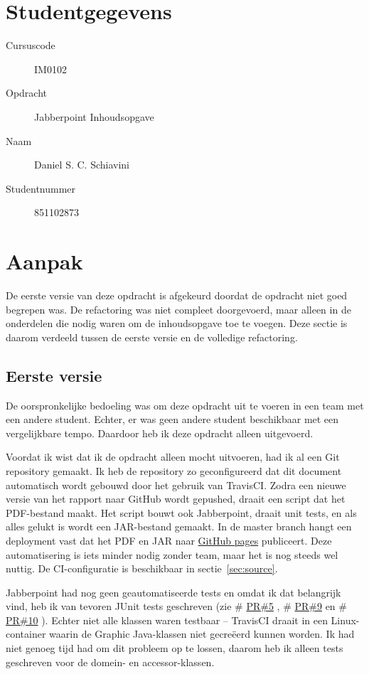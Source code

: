 \documentclass[a4paper]{article}
\makeatletter
\newcommand*{\repo}{\begingroup\@makeother\#\@repo}
\newcommand*{\@repo}[2]{%
  \href{https://github.com/DanielSchiavini/design-patterns-assignment/#1}{#2}%
  \endgroup}
\newcommand{\PR}[1]{\repo{pull/#1}{PR\##1}}
\makeatother
\begin{document}
\pagestyle{fancy}

\section*{Studentgegevens}
    \begin{description}
        \item [Cursuscode] IM0102
        \item [Opdracht] Jabberpoint Inhoudsopgave
        \item [Naam] Daniel S. C. Schiavini
        \item [Studentnummer] 851102873
    \end{description}

\section*{Aanpak}
    \label{sec:aanpak}
	De eerste versie van deze opdracht is afgekeurd doordat de opdracht niet goed begrepen was.
	De refactoring was niet compleet doorgevoerd, maar alleen in de onderdelen die nodig waren om de inhoudsopgave toe te voegen.
	Deze sectie is daarom verdeeld tussen de eerste versie en de volledige refactoring.

	\subsection*{Eerste versie}
    De oorspronkelijke bedoeling was om deze opdracht uit te voeren in een team met een andere student.
    Echter, er was geen andere student beschikbaar met een vergelijkbare tempo.
    Daardoor heb ik deze opdracht alleen uitgevoerd.

    Voordat ik wist dat ik de opdracht alleen mocht uitvoeren, had ik al een Git repository gemaakt.
    Ik heb de repository zo geconfigureerd dat dit document automatisch wordt gebouwd door het gebruik van TravisCI.
    Zodra een nieuwe versie van het rapport naar GitHub wordt gepushed, draait een script dat het PDF-bestand maakt.
    Het script bouwt ook Jabberpoint, draait unit tests, en als alles gelukt is wordt een JAR-bestand gemaakt.
    In de master branch hangt een deployment vast dat het PDF en JAR naar \href{https://github.com/DanielSchiavini/design-patterns-assignment/tree/gh-pages}{GitHub pages} publiceert.
    Deze automatisering is iets minder nodig zonder team, maar het is nog steeds wel nuttig.
    De CI-configuratie is beschikbaar in sectie~\ref{sec:source}.

    Jabberpoint had nog geen geautomatiseerde tests en omdat ik dat belangrijk vind, heb ik van tevoren JUnit tests geschreven (zie \PR{5}, \PR{9} en \PR{10}).
    Echter niet alle klassen waren testbaar -- TravisCI draait in een Linux-container waarin de Graphic Java-klassen niet gecreëerd kunnen worden.
    Ik had niet genoeg tijd had om dit probleem op te lossen, daarom heb ik alleen tests geschreven voor de domein- en accessor-klassen.
\end{document}
